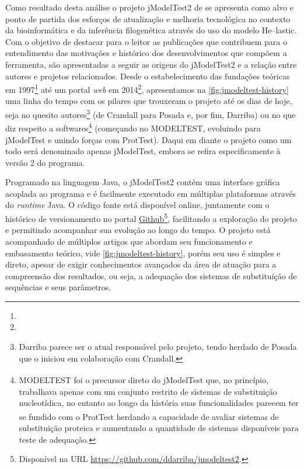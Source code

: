 \documentclass[english,brazilian]{UNISINOSmonografia} %
\begin{document}
Como resultado desta análise o projeto jModelTest2 de  se apresenta como alvo e ponto de partida dos esforços de atualização e melhoria tecnológica no contexto da bioinformática e da inferência filogenética através do uso do modelo \textsf{He}--lastic.
Com o objetivo de destacar para o leitor as publicações que contribuem para o entendimento das motivações e histórico dos desenvolvimentos que compõem a ferramenta, são apresentadas a seguir as origens do jModelTest2 e a relação entre autores e projetos relacionados.
Desde o estabelecimento das fundações teóricas em 1997\footnote{
} até um portal \textit{web} em 2014\footnote{
}, apresentamos na \autoref{fig:jmodeltest-history} uma linha do tempo com os pilares que trouxeram o projeto até os dias de hoje, seja no quesito autores\footnote{
	Darriba parece ser o atual responsável pelo projeto, tendo herdado de Posada que o iniciou em colaboração com Crandall.
} (de Crandall para Posada e, por fim, Darriba) ou no que diz respeito a softwares\footnote{
	MODELTEST\textsuperscript{\dag} foi o precursor direto do jModelTest que, no princípio, trabalhava apenas com um conjunto restrito de sistemas de substituição nucleotídica, no entanto ao longo da história suas funcionalidades parecem ter se fundido com o ProtTest\textsuperscript{\dag} herdando a capacidade de avaliar sistemas de substituição proteica e aumentando a quantidade de sistemas disponíveis para teste de adequação.
} (começando no MODELTEST, evoluindo para jModelTest e unindo forças com ProtTest).
%
Daqui em diante o projeto como um todo será denominado apenas jModelTest, embora se refira especificamente à versão 2 do programa.


{
	\renewcommand*{\thefootnote}{\fnsymbol{footnote}}
	\addtocounter{footnote}{0}
	\renewcommand*{\thefootnote}{\arabic{footnote}}
}


Programado na linguagem Java, o jModelTest2 contém uma interface gráfica acoplada ao programa e é facilmente executado em múltiplas plataformas através do \textit{runtime} Java.
O código fonte está disponível online, juntamente com o histórico de versionamento no portal \href{https://github.com/ddarriba/jmodeltest2}{Github}\footnote{
	Disponível na URL \url{https://github.com/ddarriba/jmodeltest2}.
}, facilitando a exploração do projeto e permitindo acompanhar sua evolução ao longo do tempo.
O projeto está acompanhado de múltiplos artigos que abordam seu funcionamento e embasamento teórico, vide \autoref{fig:jmodeltest-history},
porém seu uso é simples e direto, apesar de exigir conhecimentos avançados da área de atuação para a compreensão dos resultados, ou seja, a adequação dos sistemas de substituição de sequências e seus parâmetros.
\end{document}
